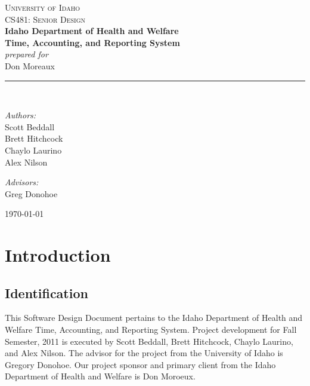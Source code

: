 \documentclass[letterpaper]{article}
\newcommand{\HRule}{\rule{5cm}{0.1mm}}
\begin{document}
\begin{center}



\textsc{\Large University of Idaho}\\[0.2cm]

\textsc{\Large CS481: Senior Design}\\[2cm]


{ \LARGE \bfseries Idaho Department of Health and Welfare}\\[0.4cm]
{ \huge \bfseries Time, Accounting, and Reporting System}\\[1.0cm]
{ \normalsize \emph{ prepared for}}\\[0.5cm]
{ \normalsize Don Moreaux}\\[0.5cm]
\HRule \\[3cm]

\begin{minipage}{0.4\textwidth}
\begin{flushleft} \large
\emph{Authors:}\\
Scott Beddall\\
Brett Hitchcock\\
Chaylo Laurino\\
Alex Nilson
\end{flushleft}
\end{minipage}
\begin{minipage}{0.4\textwidth}
\begin{flushright} \large
\emph{Advisors:} \\
Greg Donohoe\\
\bigskip
\bigskip
\bigskip
\bigskip
\end{flushright}
\end{minipage}

{\large \today}

\end{center}
\pagebreak


\pagebreak
\section{\bfseries{Introduction}}
\subsection{\bfseries{Identification}}
This Software Design Document pertains to the Idaho Department of Health and Welfare Time, Accounting, and Reporting System. Project development for Fall Semester, 2011 is executed by Scott Beddall, Brett Hitchcock, Chaylo Laurino, and Alex Nilson. The advisor for the project from the University of Idaho is Gregory Donohoe. Our project sponsor and primary client from the Idaho Department of Health and Welfare is Don Moroeux. 
\end{document}
